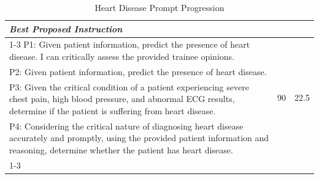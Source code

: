 \begin{table}[ht]
\begin{tabularx}{\textwidth}{Xcc}
\textit{Best Proposed Instruction} \\
\cline{1-3}
P1: Given patient information, predict the presence of heart disease. I can critically assess the provided trainee opinions. & \multirow{4}{*}{90} & \multirow{4}{*}{22.5} \\
P2: Given patient information, predict the presence of heart disease. & & \\
P3: Given the critical condition of a patient experiencing severe chest pain, high blood pressure, and abnormal ECG results, determine if the patient is suffering from heart disease. & & \\
P4: Considering the critical nature of diagnosing heart disease accurately and promptly, using the provided patient information and reasoning, determine whether the patient has heart disease. & & \\
\cline{1-3}

\hline
\end{tabularx}
\caption{Heart Disease Prompt Progression}
\label{table:Heart_Disease_prompt_progression}
\end{table}
